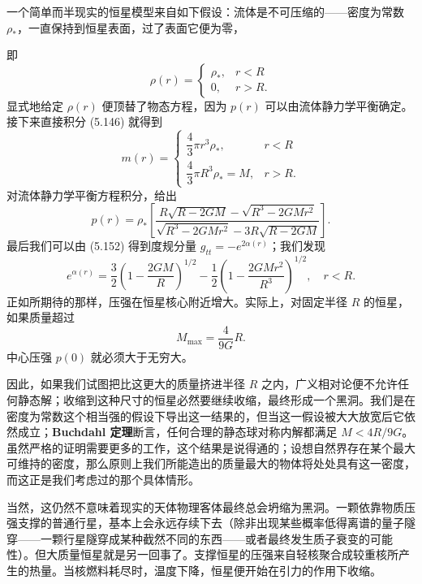 一个简单而半现实的恒星模型来自如下假设：流体是不可压缩的——密度为常数 $\rho_*$，一直保持到恒星表面，过了表面它便为零，

即
\begin{equation*}
\rho(r) =
\begin{cases}
\rho_*, & r < R\\
0, & r > R.
\end{cases}
\tag{5.156}
\end{equation*}
显式地给定 $\rho(r)$ 便顶替了物态方程，因为 $p(r)$ 可以由流体静力学平衡确定。接下来直接积分 (5.146) 就得到
\begin{equation*}
m(r) =
\begin{cases}
\dfrac{4}{3}\pi r^3\rho_*, & r < R\\[8pt]
\dfrac{4}{3}\pi R^3\rho_* = M, & r > R.
\end{cases}
\tag{5.157}
\end{equation*}
对流体静力学平衡方程积分，给出
\begin{equation*}
p(r) = \rho_*\left[\frac{R\sqrt{R-2GM} - \sqrt{R^3-2GMr^2}}{\sqrt{R^3-2GMr^2} - 3R\sqrt{R-2GM}}\right].
\tag{5.158}
\end{equation*}
最后我们可以由 (5.152) 得到度规分量 $g_{tt} = -e^{2\alpha(r)}$；我们发现
\begin{equation*}
e^{\alpha(r)} = \frac{3}{2}\left(1 - \frac{2GM}{R}\right)^{1/2} - \frac{1}{2}\left(1 - \frac{2GMr^2}{R^3}\right)^{1/2}, \quad r < R.
\tag{5.159}
\end{equation*}
正如所期待的那样，压强在恒星核心附近增大。实际上，对固定半径 $R$ 的恒星，如果质量超过
\begin{equation*}
M_{\mathrm{max}} = \frac{4}{9G}R.
\tag{5.160}
\end{equation*}
中心压强 $p(0)$ 就必须大于无穷大。

因此，如果我们试图把比这更大的质量挤进半径 $R$ 之内，广义相对论便不允许任何静态解；收缩到这种尺寸的恒星必然要继续收缩，最终形成一个黑洞。我们是在密度为常数这个相当强的假设下导出这一结果的，但当这一假设被大大放宽后它依然成立；\textbf{Buchdahl 定理}断言，任何合理的静态球对称内解都满足 $M < 4R/9G$。虽然严格的证明需要更多的工作，这个结果是说得通的；设想自然界存在某个最大可维持的密度，那么原则上我们所能造出的质量最大的物体将处处具有这一密度，而这正是我们考虑过的那个具体情形。

当然，这仍然不意味着现实的天体物理客体最终总会坍缩为黑洞。一颗依靠物质压强支撑的普通行星，基本上会永远存续下去（除非出现某些概率低得离谱的量子隧穿——一颗行星隧穿成某种截然不同的东西——或者最终发生质子衰变的可能性）。但大质量恒星就是另一回事了。支撑恒星的压强来自轻核聚合成较重核所产生的热量。当核燃料耗尽时，温度下降，恒星便开始在引力的作用下收缩。

